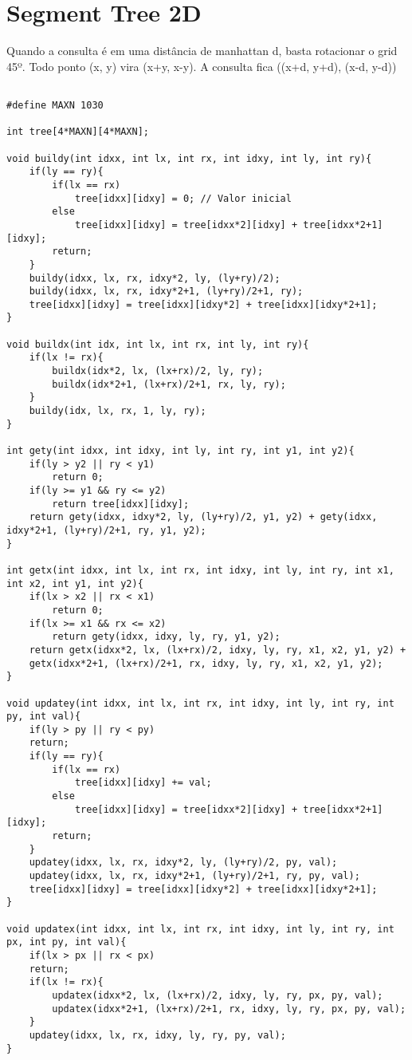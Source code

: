 \section{Segment Tree 2D}

Quando a consulta é em uma distância de manhattan d, basta rotacionar o grid 45º.
Todo ponto (x, y) vira (x+y, x-y).
A consulta fica ((x+d, y+d), (x-d, y-d))

\begin{multicols}{2}
	\begin{lstlisting}

#define MAXN 1030

int tree[4*MAXN][4*MAXN];

void buildy(int idxx, int lx, int rx, int idxy, int ly, int ry){
	if(ly == ry){
		if(lx == rx)
			tree[idxx][idxy] = 0; // Valor inicial
		else
			tree[idxx][idxy] = tree[idxx*2][idxy] + tree[idxx*2+1][idxy];
		return;
	}
	buildy(idxx, lx, rx, idxy*2, ly, (ly+ry)/2);
	buildy(idxx, lx, rx, idxy*2+1, (ly+ry)/2+1, ry);
	tree[idxx][idxy] = tree[idxx][idxy*2] + tree[idxx][idxy*2+1];
}

void buildx(int idx, int lx, int rx, int ly, int ry){
	if(lx != rx){
		buildx(idx*2, lx, (lx+rx)/2, ly, ry);
		buildx(idx*2+1, (lx+rx)/2+1, rx, ly, ry);
	}
	buildy(idx, lx, rx, 1, ly, ry);
}

int gety(int idxx, int idxy, int ly, int ry, int y1, int y2){
	if(ly > y2 || ry < y1)
		return 0;
	if(ly >= y1 && ry <= y2)
		return tree[idxx][idxy];
	return gety(idxx, idxy*2, ly, (ly+ry)/2, y1, y2) + gety(idxx, idxy*2+1, (ly+ry)/2+1, ry, y1, y2);
}

int getx(int idxx, int lx, int rx, int idxy, int ly, int ry, int x1, int x2, int y1, int y2){
	if(lx > x2 || rx < x1)
		return 0;
	if(lx >= x1 && rx <= x2)
		return gety(idxx, idxy, ly, ry, y1, y2);
	return getx(idxx*2, lx, (lx+rx)/2, idxy, ly, ry, x1, x2, y1, y2) +
	getx(idxx*2+1, (lx+rx)/2+1, rx, idxy, ly, ry, x1, x2, y1, y2);
}

void updatey(int idxx, int lx, int rx, int idxy, int ly, int ry, int py, int val){
	if(ly > py || ry < py)
	return;
	if(ly == ry){
		if(lx == rx)
			tree[idxx][idxy] += val;
		else
			tree[idxx][idxy] = tree[idxx*2][idxy] + tree[idxx*2+1][idxy];
		return;
	}
	updatey(idxx, lx, rx, idxy*2, ly, (ly+ry)/2, py, val);
	updatey(idxx, lx, rx, idxy*2+1, (ly+ry)/2+1, ry, py, val);
	tree[idxx][idxy] = tree[idxx][idxy*2] + tree[idxx][idxy*2+1];
}

void updatex(int idxx, int lx, int rx, int idxy, int ly, int ry, int px, int py, int val){
	if(lx > px || rx < px)
	return;
	if(lx != rx){
		updatex(idxx*2, lx, (lx+rx)/2, idxy, ly, ry, px, py, val);
		updatex(idxx*2+1, (lx+rx)/2+1, rx, idxy, ly, ry, px, py, val);
	}
	updatey(idxx, lx, rx, idxy, ly, ry, py, val);
}

	\end{lstlisting}
\end{multicols}


